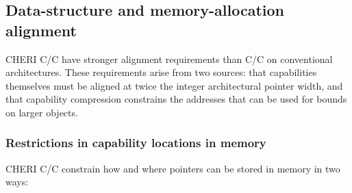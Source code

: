 \documentclass[12pt,twoside,openright,a4paper]{article}
\newcommand{\note}[2]{{\color{blue}[ Note: #1 - #2]}}
\renewcommand{\note}[2]{\relax\ifhmode\unskip\fi}
\newcommand{\amnote}[1]{\note{#1}{Alfredo M.}}
\newcommand*{\cpp}[1][]{C\textsmaller[2]{\nolinebreak[4]\hspace{-.05em}\raisebox{.45ex}{\textbf{++}}}}
\begin{document}
\subsection{Data-structure and memory-allocation alignment}

CHERI C/\cpp{} have stronger alignment requirements than C/\cpp{} on conventional
architectures.
These requirements arise from two sources: that capabilities themselves must
be aligned at twice the integer architectural pointer width, and that
capability compression constrains the addresses that can be used for bounds
on larger objects.
\amnote{Is is worth mentioning compiler flags to warn on excessive padding?
  In particular it seems that it is often the case that the ordering of
  struct elements that was devised for 32bit and 64bit architectures does
  not help much to avoid extra padding with capabilities. It more or less
  depends on how much the pointers are scattered in the struct definition.}

\subsubsection{Restrictions in capability locations in memory}
\label{sec:restricted-capability-locations}

CHERI C/\cpp{} constrain how and where pointers can be stored in memory in two
ways:
\end{document}
